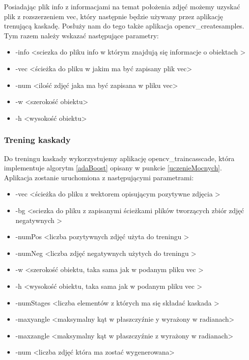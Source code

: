 Posiadając plik info z informacjami na temat położenia zdjęć możemy uzyskać plik z rozszerzeniem vec, który następnie będzie używany przez aplikację trenującą kaskadę. Posłuży nam do tego także aplikacja opencv\_createsamples. Tym razem należy wskazać następujące parametry:

\begin{itemize}
	\item -info \textless sciezka do pliku info w którym znajdują się informacje o obiektach \textgreater
	\item -vec \textless ścieżka do pliku w jakim ma być zapisany plik vec\textgreater
	\item -num \textless ilość zdjęć jaka ma być zapisana w pliku vec\textgreater
	\item -w \textless szerokość obiektu\textgreater
	\item -h \textless wysokość obiektu\textgreater
	
\end{itemize}

\subsubsection{Trening kaskady}

Do treningu kaskady wykorzystujemy aplikację opencv\_traincasscade, która implementuje algorytm \ref{adaBoost} opisany w punkcie \ref{uczenieMocnych}. Aplikacja zostanie uruchomiona z następującymi parametrami:

\begin{itemize}
	\item -vec \textless ścieżka do pliku z wektorem opisującym pozytywne zdjęcia \textgreater
	\item -bg \textless sciezka do pliku z zapisanymi ścieżkami plików tworzących zbiór zdjęć negatywnych \textgreater
	\item -numPos \textless liczba pozytywnych zdjęć użyta do treningu \textgreater
	\item -numNeg \textless liczba zdjęć negatywnych użytych do treningu \textgreater
	\item -w \textless szerokość obiektu, taka sama jak w podanym pliku vec \textgreater
	\item -h \textless wysokość obiektu, taka sama jak w podanym pliku vec \textgreater
	\item -numStages \textless liczba elementów z których ma się składać kaskada \textgreater
	\item -maxyangle \textless maksymalny kąt w płaszczyźnie y wyrażony w radianach\textgreater
	\item -maxzangle \textless maksymalny kąt w płaszczyźnie z wyrażony w radianach\textgreater
	\item -num \textless liczba zdjęć która ma zostać wygenerowana>
	
\end{itemize}

